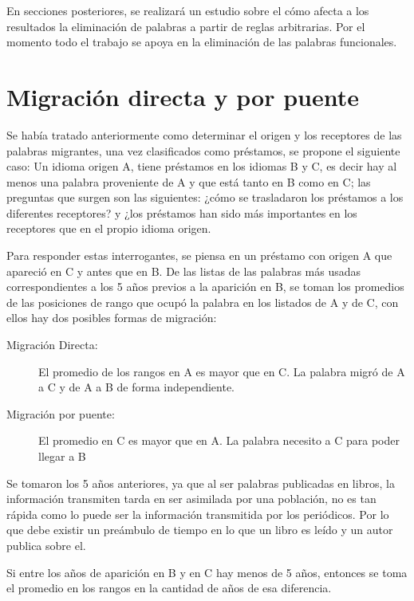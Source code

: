 En secciones posteriores, se realizará un estudio sobre el cómo afecta a los resultados la eliminación de palabras a partir de reglas arbitrarias.  Por el momento todo el trabajo se apoya en la eliminación de las palabras funcionales.


\section{Migración directa y por puente}

Se había tratado anteriormente como determinar el origen y los receptores de las palabras migrantes, una vez clasificados como préstamos, se propone el siguiente caso: 
Un idioma origen A, tiene préstamos en los idiomas B y C,  es decir hay al menos una palabra proveniente de A y que está tanto en B como en C; las preguntas que surgen son las siguientes: ¿cómo se trasladaron los préstamos a los diferentes receptores? y ¿los préstamos han sido más importantes en los receptores que en el propio idioma origen. 

Para responder estas interrogantes, se piensa en un préstamo con origen A  que apareció en C y antes que en B. De las listas de las palabras más usadas correspondientes a los 5 años previos a la aparición en B,  se toman  los promedios de las posiciones de rango que ocupó  la palabra  en los listados de A y de C, con ellos hay dos posibles formas de migración:


\begin{description}
	
	\item[Migración Directa:] El promedio de los rangos en A es mayor que en C. La palabra migró de A a C y de A a B de forma independiente. 
	
	\item[Migración por puente:] El promedio en C es mayor que en A. La palabra necesito a C para poder llegar a B
	
\end{description}


Se tomaron los 5 años anteriores, ya que al ser palabras publicadas en libros, la información transmiten tarda en ser asimilada por una población, no es tan rápida como lo puede ser la información transmitida por los periódicos. Por lo que debe existir un preámbulo de tiempo en lo que un libro es leído y un autor publica sobre el.

Si entre los años de aparición en B y en C hay menos de 5 años, entonces se toma el promedio en los rangos en la cantidad de años de esa diferencia.


